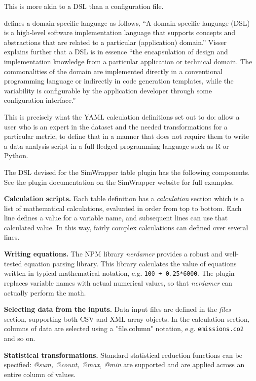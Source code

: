 This is more akin to a \gls{DSL} than a configuration file.

\cite{Visser2008} defines a domain-specific language as follows, ``A domain-specific language (DSL) is a high-level software implementation language that supports concepts and abstractions that are related to a particular (application) domain.'' Visser explains further that a DSL is in essence ``the encapsulation of design and implementation knowledge from a particular application or technical domain. The commonalities of the domain are implemented directly in a conventional programming language or indirectly in code generation templates, while the variability is configurable by the application developer through some configuration interface.''

This is precisely what the YAML calculation definitions set out to do: allow a user who is an expert in the dataset and the needed transformations for a particular metric, to define that in a manner that does not require them to write a data analysis script in a full-fledged programming language such as R or Python.

The DSL devised for the SimWrapper table plugin has the following components. See the plugin documentation on the SimWrapper website for full examples.

\textbf{Calculation scripts.} Each table definition has a \emph{calculation} section which is a list of mathematical calculations, evaluated in order from top to bottom. Each line defines a value for a variable name, and subsequent lines can use that calculated value. In this way, fairly complex calculations can defined over several lines.

\textbf{Writing equations.} The NPM library \emph{nerdamer} provides a robust and well-tested equation parsing library. This library calculates the value of equations written in typical mathematical notation, e.g. \texttt{100 + 0.25*6000}. The plugin replaces variable names with actual numerical values, so that \emph{nerdamer} can actually perform the math.

\textbf{Selecting data from the inputs.} Data input files are defined in the \emph{files} section, supporting both CSV and XML array objects. In the calculation section, columns of data are selected using a "file.column" notation, e.g. \texttt{emissions.co2} and so on.

\textbf{Statistical transformations.} Standard statistical reduction functions can be specified: \emph{@sum, @count, @max, @min} are supported and are applied across an entire column of values.

